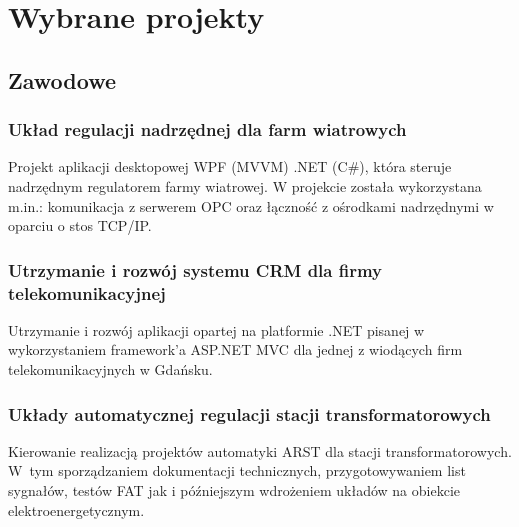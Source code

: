 \documentclass[letterpaper]{template/twentysecondcv} %
\begin{document}
\begin{twenty} %
\end{twenty}

\vspace{-0.25cm}
\section{Wybrane projekty}
\subsection{Zawodowe}
\vspace{-0.25cm}


\subsubsection*{Układ regulacji nadrzędnej dla farm wiatrowych}
Projekt aplikacji desktopowej WPF (MVVM) .NET (C\#), która steruje nadrzędnym regulatorem farmy wiatrowej. W projekcie została wykorzystana m.in.: komunikacja z serwerem OPC oraz łączność z ośrodkami nadrzędnymi w oparciu o stos TCP/IP.

\subsubsection*{Utrzymanie i rozwój systemu CRM dla firmy telekomunikacyjnej}
Utrzymanie i rozwój aplikacji opartej na platformie .NET pisanej w wykorzystaniem framework'a ASP.NET MVC dla jednej z wiodących firm telekomunikacyjnych w Gdańsku. 

\subsubsection*{Układy automatycznej regulacji stacji transformatorowych}
Kierowanie realizacją projektów automatyki ARST dla stacji transformatorowych. W~tym sporządzaniem dokumentacji technicznych, przygotowywaniem list sygnałów, testów FAT jak i późniejszym wdrożeniem układów na obiekcie elektroenergetycznym.
\end{document}
